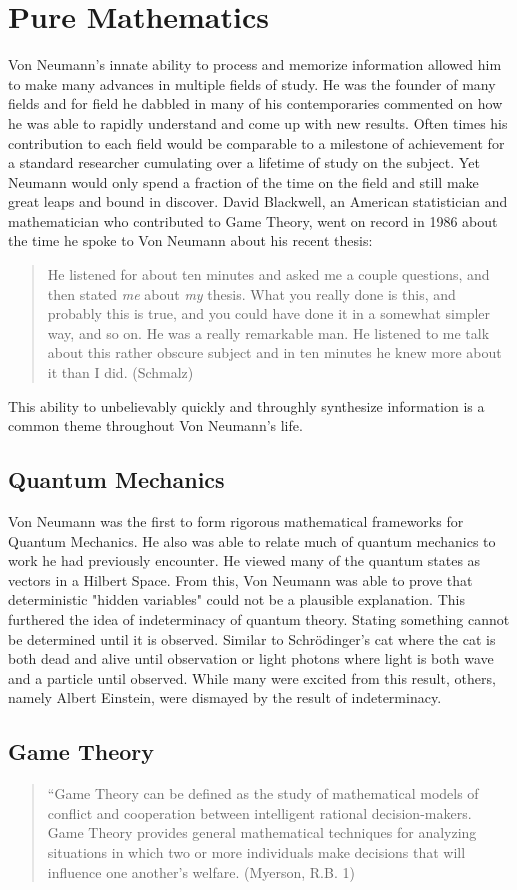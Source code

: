 \documentclass[12pt]{article}
\begin{document}
\section*{Pure Mathematics}
	Von Neumann's innate ability to process and memorize information allowed him to make many advances in multiple fields of study. He was the founder of many fields and for field he dabbled in many of his contemporaries commented on how he was able to rapidly understand and come up with new results. Often times his contribution to each field would be comparable to a milestone of achievement for a standard researcher cumulating over a lifetime of study on the subject. Yet Neumann would only spend a fraction of the time on the field and still make great leaps and bound in discover. David Blackwell, an American statistician and mathematician who contributed to Game Theory, went on record in 1986 about the time he spoke to Von Neumann about his recent thesis:
	\begin{quotation}
		He listened for about ten minutes and asked me a couple questions, and then stated \textit{me} about \textit{my} thesis. What you really done is this, and probably this is true, and you could have done it in a somewhat simpler way, and so on. He was a really remarkable man. He listened to me talk about this rather obscure subject and in ten minutes he knew more about it than I did. (Schmalz)
	\end{quotation}
  This ability to unbelievably quickly and throughly synthesize information is a common theme throughout Von Neumann's life.
\subsection*{Quantum Mechanics}
 	Von Neumann was the first to form rigorous mathematical frameworks for Quantum Mechanics. He also was able to relate much of quantum mechanics to work he had previously encounter. He viewed many of the quantum states as vectors in a Hilbert Space. From this, Von Neumann was able to prove that deterministic "hidden variables" could not be a plausible explanation. This furthered the idea of indeterminacy of quantum theory. Stating something cannot be determined until it is observed. Similar to Schrödinger's cat where the cat is both dead and alive until observation or light photons where light is both wave and a particle until observed. While many were excited from this result, others, namely Albert Einstein, were dismayed by the result of indeterminacy.
\subsection*{Game Theory}
	\begin{quotation}
				``Game Theory can be defined as the study of mathematical models of
		conflict and cooperation between intelligent rational decision-makers.
		Game Theory provides general mathematical techniques for analyzing
		situations in which two or more individuals make decisions that will
		influence one another's welfare. (Myerson, R.B. 1)
	\end{quotation}
\end{document}

